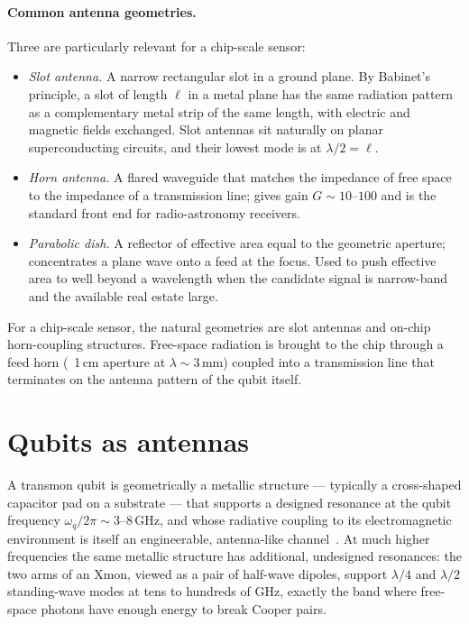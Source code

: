 \paragraph{Common antenna geometries.}
Three are particularly relevant for a chip-scale sensor:
\begin{itemize}
  \item \emph{Slot antenna.} A narrow rectangular slot in a
        ground plane. By Babinet's principle, a slot of length
        $\ell$ in a metal plane has the same radiation pattern as
        a complementary metal strip of the same length, with
        electric and magnetic fields exchanged.  Slot antennas
        sit naturally on planar superconducting circuits, and
        their lowest mode is at $\lambda/2 = \ell$.
  \item \emph{Horn antenna.} A flared waveguide that matches the
        impedance of free space to the impedance of a transmission
        line; gives gain $G\sim 10$--$100$ and is the standard
        front end for radio-astronomy receivers.
  \item \emph{Parabolic dish.} A reflector of effective area
        equal to the geometric aperture; concentrates a plane wave
        onto a feed at the focus. Used to push effective area to
        well beyond a wavelength when the candidate signal is
        narrow-band and the available real estate large.
\end{itemize}
For a chip-scale sensor, the natural geometries are slot antennas
and on-chip horn-coupling structures. Free-space radiation is
brought to the chip through a feed horn (~1\,cm aperture at
$\lambda\sim 3\,\text{mm}$) coupled into a transmission line that
terminates on the antenna pattern of the qubit itself.

\section{Qubits as antennas}
\label{sec:qubit-as-antenna}

\begin{phenomenon}
A transmon qubit is geometrically a metallic structure --- typically
a cross-shaped capacitor pad on a substrate --- that supports a
designed resonance at the qubit frequency $\omega_q/2\pi\sim
3$--$8\,\text{GHz}$, and whose radiative coupling to its
electromagnetic environment is itself an engineerable, antenna-like
channel~\cite{houck2008}.  At much higher frequencies the same
metallic structure has additional, undesigned resonances: the
two arms of an Xmon, viewed as a pair of half-wave dipoles,
support $\lambda/4$ and $\lambda/2$ standing-wave modes at tens
to hundreds of GHz, exactly the band where free-space photons
have enough energy to break Cooper pairs.
\end{phenomenon}

